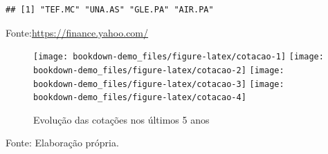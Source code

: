 \documentclass[
  12pt,
  a4paper,
  openany]{book}
\begin{document}
\begin{verbatim}
## [1] "TEF.MC" "UNA.AS" "GLE.PA" "AIR.PA"
\end{verbatim}

\normalsize

\begin{table}[!h]

\caption{\label{tab:unnamed-chunk-4}Société Générale.Euronext Paris-25-05-2020/01-06-2020}
\centering
{}
\end{table}
\FloatBarrier
\centering

Fonte:\url{https://finance.yahoo.com/}

\justifying
\bigskip

\begin{figure}

{\centering \texttt{[image: bookdown-demo\_files/figure-latex/cotacao-1]} \texttt{[image: bookdown-demo\_files/figure-latex/cotacao-2]} \texttt{[image: bookdown-demo\_files/figure-latex/cotacao-3]} \texttt{[image: bookdown-demo\_files/figure-latex/cotacao-4]} 

}

\caption{Evolução das cotações nos últimos 5 anos}\label{fig:cotacao}
\end{figure}
\FloatBarrier
\centering

Fonte: Elaboração própria.

\justifying
\bigskip
\end{document}
